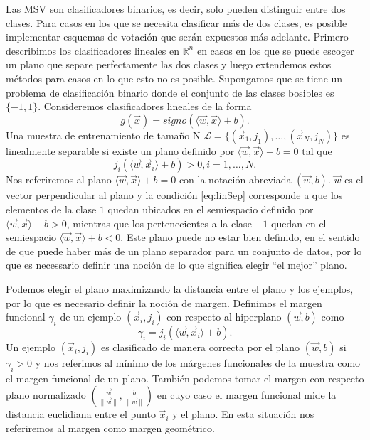 \documentclass[letterpaper,12pt]{book}
\begin{document}
Las MSV son clasificadores binarios, es decir, solo pueden distinguir entre dos clases. Para casos en los que se necesita clasificar más de dos clases, es posible implementar esquemas de votación que serán expuestos más adelante. Primero describimos los clasificadores lineales en $\mathbb{R}^n$ en casos en los que se puede escoger un plano que separe perfectamente las dos clases y luego extendemos estos métodos para casos en lo que esto no es posible. Supongamos que se tiene un problema de clasificación binario donde el conjunto de las clases bosibles es $\{-1,1\}$. Consideremos clasificadores lineales de la forma
\begin{equation}\label{eq:clasificadorLineal}
g(\vec{x}) = signo( \langle \vec{w}, \vec{x} \rangle + b).
\end{equation}
 Una muestra de entrenamiento de tamaño N  $\mathcal{L} = \{(\vec{x}_1, j_1), \dots, (\vec{x}_N, j_N)\}$ es linealmente separable si existe un plano definido por $\langle \vec{w}, \vec{x} \rangle +b =0$ tal que
\begin{equation}\label{eq:linSep}
j_{i}\left(\langle \vec{w}, \vec{x}_i \rangle +b\right)> 0, i = 1,\dots, N.
\end{equation}
Nos referiremos al plano $\langle \vec{w}, \vec{x} \rangle +b = 0$ con la notación abreviada $(\vec{w},b)$. $\vec{w}$ es el vector perpendicular al plano y la condición \ref{eq:linSep} corresponde a que los elementos de la clase $1$ quedan ubicados en el semiespacio definido por $\langle \vec{w}, \vec{x} \rangle +b > 0$, mientras que los pertenecientes a la clase $-1$ quedan en el semiespacio $\langle \vec{w}, \vec{x} \rangle + b< 0$. Este plano puede no estar bien definido, en el sentido de que puede haber más de un plano separador para un conjunto de datos, por lo que es necessario definir una noción de lo que significa elegir ``el mejor'' plano.

Podemos elegir el plano maximizando la distancia entre el plano y los ejemplos, por lo que es necesario definir la noción de margen. Definimos el margen funcional $\gamma_i$ de un ejemplo $(\vec{x}_i, j_i)$ con respecto al hiperplano $(\vec{w}, b)$ como
\begin{equation}
\gamma_i = j_i(\langle\vec{w}, \vec{x}_i \rangle + b).
\end{equation}
Un ejemplo $(\vec{x}_i, j_i)$ es clasificado de manera correcta por el plano $(\vec{w}, b)$ si $\gamma_i>0$ y nos referimos al  mínimo de los márgenes funcionales de la muestra como el margen funcional de un plano. También podemos tomar el margen con respecto plano normalizado $(\frac{\vec{w}}{\|\vec{w}\|},\frac{b}{\|\vec{w}\|})$ en cuyo caso el margen funcional mide la distancia euclidiana entre el punto $\vec{x}_i$ y el plano. En esta situación nos referiremos al margen como  margen geométrico. 
\end{document}
